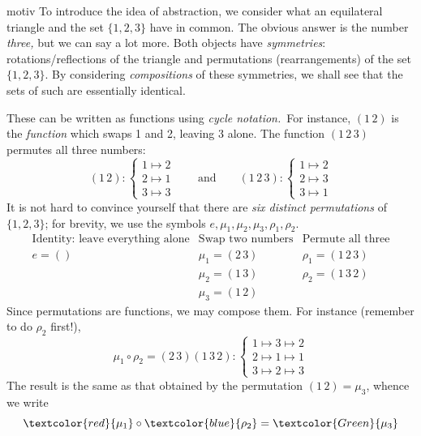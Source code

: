 \begin{example}{}{motiv}
	To introduce the idea of abstraction, we consider what an equilateral triangle and the set $\{1,2,3\}$ have in common.\smallbreak
	The obvious answer is the number \emph{three,} but we can say a lot more. Both objects have \emph{symmetries}: rotations/reflections of the triangle and permutations (rearrangements) of the set $\{1,2,3\}$. By considering \emph{compositions} of these symmetries, we shall see that the sets of such are essentially identical.%
	
	 These can be written as functions using \emph{cycle notation.}\footnotemark\ For instance, $(1\,2)$ is the \emph{function} which swaps 1 and 2, leaving 3 alone. The function $(1\,2\,3)$ permutes all three numbers:
	\[
		(1\,2):
		\begin{cases}
			1\mapsto 2\\
			2\mapsto 1\\
			3\mapsto 3
		\end{cases}
		\qquad\text{and}\qquad
		(1\,2\,3):
		\begin{cases}
			1\mapsto 2\\
			2\mapsto 3\\
			3\mapsto 1
		\end{cases}
	\]
	It is not hard to convince yourself that there are \emph{six distinct permutations} of $\{1,2,3\}$; for brevity, we use the symbols $e,\mu_1,\mu_2,\mu_3,\rho_1,\rho_2$.
	\[
		\begin{array}{c|c|c}
			\text{Identity: leave everything alone} & \text{Swap two numbers} & \text{Permute all three}\\\hline
			e=() & \mu_1=(2\,3) & \rho_1=(1\,2\,3)\\
			& \mu_2=(1\,3) & \rho_2=(1\,3\,2)\\
			& \mu_3=(1\,2) &
		\end{array}
	\]
	Since permutations are functions, we may compose them. For instance (remember to do $\rho_2$ first!),
	\[
		\mu_1\circ\rho_2=(2\,3)(1\,3\,2):
		\begin{cases}
			1\mapsto 3\mapsto 2\\
			2\mapsto 1\mapsto 1\\
			3\mapsto 2\mapsto 3
		\end{cases}
	\]
	The result is the same as that obtained by the permutation $(1\,2)=\mu_3$, whence we write
	\[
		\textcolor{red}{\mu_1}\circ\textcolor{blue}{\rho_2}=\textcolor{Green}{\mu_3}
\]
\end{example}
